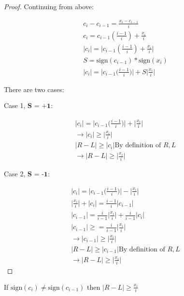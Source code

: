 \documentclass[11pt,twocolumn]{article}
\begin{document}
\begin{proof}
Continuing from above:

\begin{eqnarray*}
c_i - c_{i-1} = \frac{x_i - c_{i - 1} }{ i } \\
c_i = c_{i-1}( \frac{i-1}{i}) + \frac{x_i }{ i } \\
\big|c_i\big| = \big|c_{i-1} (\frac{i-1}{i}) + \frac{x_i }{ i }\big| \\
S = \textrm{sign}(c_{i-1} )*\textrm{sign}(x_i) \\
\big|c_i\big| = \big|c_{i-1} \big( \frac{i-1}{i} \big)\big| + S\big|\frac{x_i}{ i }\big|
\end{eqnarray*}

There are two cases:

Case 1, $\textbf{S = +1}$: 

\begin{eqnarray*}
\big|c_i\big| = \big|c_{i-1} \big( \frac{i-1}{i} \big) \big| + \big|\frac{x_i}{i}\big| \\
\rightarrow \big|c_i\big| \geq \big|\frac{x_i}{i}\big| \\ 
\big|R-L\big| \geq \big|c_i\big| \textrm{By definition of } R,L \\
\rightarrow \big|R-L\big| \geq \big|\frac{x_i}{i}\big|
\end{eqnarray*}

Case 2, $\textbf{S = -1}$: 

\begin{eqnarray*}
\big|c_i\big| = \big|c_{i-1} \big( \frac{i-1}{i} \big)\big| - \big|\frac{x_i}{i}\big| \\
\big|\frac{x_i}{i}\big| + \big|c_i\big| = \frac{i-1}{i}\big|c_{i-1}\big|  \\
\big|c_{i-1}\big| = \frac{i}{i-1}\big|\frac{x_i}{i}\big| + \frac{i}{i-1}\big|c_i\big| \\
\big|c_{i-1}\big| \geq = \frac{i}{i-1}\big|\frac{x_i}{i}\big| \\
\rightarrow \big|c_{i-1}\big| \geq \big|\frac{x_i}{i}\big| \\
\big|R-L\big| \geq \big|c_{i-1}\big| \textrm{By definition of } R,L \\ 
\rightarrow \big|R-L\big| \geq \big|\frac{x_i}{i}\big|
\end{eqnarray*}
\end{proof}

\begin{lem} \label{lem:diffSignNaive}
If $\textrm{sign}(c_i) \neq \textrm{sign}(c_{i-1})$ then $\big|R - L\big| \geq \frac{x_i}{i}$
\end{lem}
\end{document}
